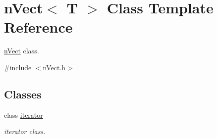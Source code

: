 \hypertarget{classnVect}{}\section{n\+Vect$<$ T $>$ Class Template Reference}
\label{classnVect}


\hyperlink{classnVect}{n\+Vect} class.  




{\ttfamily \#include $<$n\+Vect.\+h$>$}

\subsection*{Classes}
\begin{DoxyCompactItemize}
\item 
class \hyperlink{classnVect_1_1iterator}{iterator}
\begin{DoxyCompactList}\small\item\em iterator class. \end{DoxyCompactList}\end{DoxyCompactItemize}
